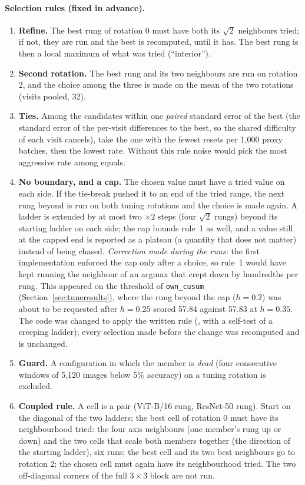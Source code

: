 \documentclass[10pt]{article}
\newcommand{\rl}[1]{\texttt{#1}}
\newcommand{\vit}{ViT-B/16}
\newcommand{\rn}{ResNet-50}
\begin{document}
\paragraph{Selection rules (fixed in advance).}
\begin{enumerate}
  \item \textbf{Refine.} The best rung of rotation 0 must have both its $\sqrt2$ neighbours tried; if not, they are run and the best is recomputed, until it has. The best rung is then a local maximum of what was tried (``interior'').
  \item \textbf{Second rotation.} The best rung and its two neighbours are run on rotation 2, and the choice among the three is made on the mean of the two rotations (visits pooled, 32).
  \item \textbf{Ties.} Among the candidates within one \emph{paired} standard error of the best (the standard error of the per-visit differences to the best, so the shared difficulty of each visit cancels), take the one with the fewest resets per 1,000 proxy batches, then the lowest rate. Without this rule noise would pick the most aggressive rate among equals.
  \item \textbf{No boundary, and a cap.} The chosen value must have a tried value on each side. If the tie-break pushed it to an end of the tried range, the next rung beyond is run on both tuning rotations and the choice is made again. A ladder is extended by at most two $\times 2$ steps (four $\sqrt2$ rungs) beyond its starting ladder on each side; the cap bounds rule~1 as well, and a value still at the capped end is reported as a plateau (a quantity that does not matter) instead of being chased. \emph{Correction made during the runs:} the first implementation enforced the cap only after a choice, so rule~1 would have kept running the neighbour of an argmax that crept down by hundredths per rung. This appeared on the threshold of \rl{own\_cusum} (Section~\ref{sec:tuneresults}), where the rung beyond the cap ($h = 0.2$) was about to be requested after $h = 0.25$ scored 57.84 against 57.83 at $h = 0.35$. The code was changed to apply the written rule (, with a self-test of a creeping ladder); every selection made before the change was recomputed and is unchanged.
  \item \textbf{Guard.} A configuration in which the member is \emph{dead} (four consecutive windows of 5,120 images below 5\% accuracy) on a tuning rotation is excluded.
  \item \textbf{Coupled rule.} A cell is a pair (\vit{} rung, \rn{} rung). Start on the diagonal of the two ladders; the best cell of rotation 0 must have its neighbourhood tried: the four axis neighbours (one member's rung up or down) and the two cells that scale both members together (the direction of the starting ladder), six runs; the best cell and its two best neighbours go to rotation 2; the chosen cell must again have its neighbourhood tried. The two off-diagonal corners of the full $3 \times 3$ block are not run.
\end{enumerate}
\end{document}
